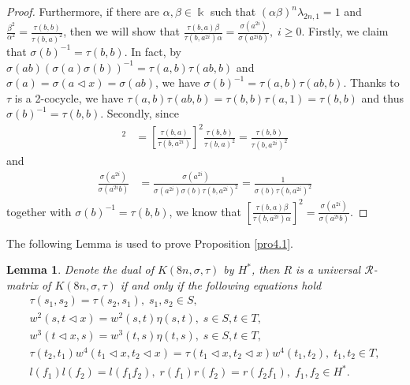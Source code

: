 \documentclass[a4paper,11pt]{amsart}
\numberwithin{equation}{section}
\newtheorem{lemma}[theorem]{Lemma}
\begin{document}
\begin{proof}
Furthermore, if there are $\alpha,\beta \in \Bbbk$ such that $(\alpha\beta)^n \lambda_{2n,1}=1$ and $\frac{\beta^2}{\alpha^2}=\frac{\tau(b,b)}{\tau(b,a)^2}$, then we will show that $\frac{\tau(b,a)\beta}{\tau(b,a^{2i})\alpha}=\frac{\sigma(a^{2i})}{\sigma(a^{2i}b)},\; i\geq 0$.
Firstly, we claim that $\sigma(b)^{-1}=\tau(b,b)$. In fact, by $\sigma(ab)(\sigma(a)\sigma(b))^{-1}=\tau(a,b)\tau(ab,b)$ and $\sigma(a)=\sigma(a\triangleleft x)=\sigma(ab)$, we have $\sigma(b)^{-1}=\tau(a,b)\tau(ab,b)$. Thanks to $\tau$ is a 2-cocycle, we have $\tau(a,b)\tau(ab,b)=\tau(b,b)\tau(a,1)=\tau(b,b)$ and thus $\sigma(b)^{-1}=\tau(b,b)$. Secondly, since
\begin{align*}
[\frac{\tau(b,a)\beta}{\tau(b,a^{2i})\alpha}]^2&=[\frac{\tau(b,a)}{\tau(b,a^{2i})}]^2 \frac{\tau(b,b)}{\tau(b,a)^2}=\frac{\tau(b,b)}{\tau(b,a^{2i})^2}
\end{align*}
and
\begin{align*}
\frac{\sigma(a^{2i})}{\sigma(a^{2i}b)}&=\frac{\sigma(a^{2i})}{\sigma(a^{2i}) \sigma(b) \tau(b,a^{2i})^2}=\frac{1}{\sigma(b) \tau(b,a^{2i})^{2}}
\end{align*}
 together with $\sigma(b)^{-1}=\tau(b,b)$, we know that $[\frac{\tau(b,a)\beta}{\tau(b,a^{2i})\alpha}]^2=\frac{\sigma(a^{2i})}{\sigma(a^{2i}b)}$.
\end{proof}



The following Lemma  is used to prove Proposition \ref{pro4.1}.
\begin{lemma}\label{lem3.1}
Denote the dual of $K(8n,\sigma,\tau)$ by $H^*$, then $R$ is a universal $\mathcal{R}$-matrix of $K(8n,\sigma,\tau)$ if and only if the following equations hold
\begin{gather}
\label{e3.11} \tau(s_1,s_2)=\tau(s_2,s_1),\; s_1,s_2\in S,\\
\label{e3.12} w^2(s,t\triangleleft x)=w^2(s,t)\eta(s,t),\; s \in S,t\in T,\\
\label{e3.13} w^3(t\triangleleft x,s)=w^3(t,s)\eta(t,s),\;s \in S,t\in T,\\
\label{e3.14} \tau(t_2,t_1)w^4(t_1\triangleleft x,t_2\triangleleft x)=\tau(t_1\triangleleft x,t_2\triangleleft x)w^4(t_1,t_2),\;t_1,t_2 \in T,\\
\label{e3.15} l(f_1)l(f_2)=l(f_1f_2),\;r(f_1)r(f_2)=r(f_2f_1),\;f_1,f_2\in H^*.
\end{gather}
\end{lemma}
\end{document}
